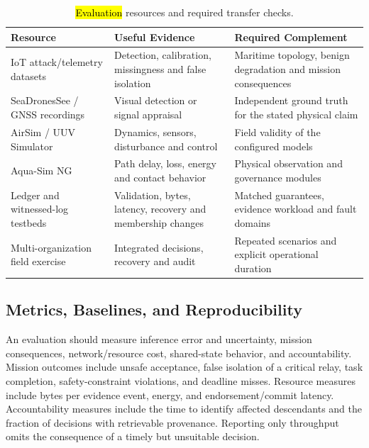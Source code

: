 \documentclass[blockchains,review,accept,moreauthors]{Definitions/mdpi}
\begin{document}
\begin{table}[H]
\caption{\hl{Evaluation} %
 resources and required transfer checks.\label{tab:evaluation}}
\begin{tabularx}{\textwidth}{LLL}
\toprule
\textbf{Resource} & \textbf{Useful Evidence} & \textbf{Required Complement}\\
\midrule
IoT attack/telemetry datasets & Detection, calibration, missingness and false isolation & Maritime topology, benign degradation and mission consequences\\
SeaDronesSee / GNSS recordings & Visual detection or signal appraisal & Independent ground truth for the stated physical claim\\
AirSim / UUV Simulator & Dynamics, sensors, disturbance and control & Field validity of the configured models\\
Aqua-Sim NG & Path delay, loss, energy and contact behavior & Physical observation and governance modules\\
Ledger and witnessed-log testbeds & Validation, bytes, latency, recovery and membership changes & Matched guarantees, evidence workload and fault domains\\
Multi-organization field exercise & Integrated decisions, recovery and audit & Repeated scenarios and explicit operational duration\\
\bottomrule
\end{tabularx}
\end{table}

\subsection{Metrics, Baselines, and Reproducibility}

An evaluation should measure inference error and uncertainty, mission consequences, network/resource cost, shared-state behavior, and accountability. Mission outcomes include unsafe acceptance, false isolation of a critical relay, task completion, safety-constraint violations, and deadline misses. Resource measures include bytes per evidence event, energy, and endorsement/commit latency. Accountability measures include the time to identify affected descendants and the fraction of decisions with retrievable provenance. Reporting only throughput omits the consequence of a timely but unsuitable decision.
\end{document}
